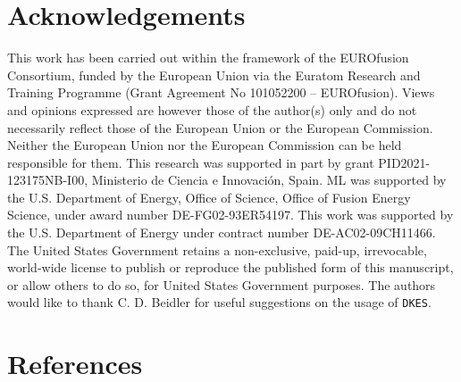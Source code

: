 \documentclass[10pt]{iopart}
\newcommand{\DKES}{{\texttt{DKES}}}
\begin{document}
\section*{Acknowledgements}
This work has been carried out within the framework of the EUROfusion Consortium, funded by the European Union via the Euratom Research and Training Programme (Grant Agreement No 101052200 – EUROfusion). Views and opinions expressed are however those of the author(s) only and do not necessarily reflect those of the European Union or the European Commission. Neither the European Union nor the European Commission can be held responsible for them. This research was supported in part by grant PID2021-123175NB-I00, Ministerio de Ciencia e Innovación, Spain. ML was supported by the U.S. Department of Energy, Office of Science, Office of Fusion Energy Science, under award number DE-FG02-93ER54197. This work was supported by the U.S. Department of Energy under contract number DE-AC02-09CH11466. The United States Government retains a non-exclusive, paid-up, irrevocable, world-wide license to publish or reproduce the published form of this manuscript, or allow others to do so, for United States Government purposes. The authors would like to thank C. D. Beidler for useful suggestions on the usage of {\DKES}.



\FloatBarrier
\appendix



	

%
	
\FloatBarrier
\section*{References}

{}
\end{document}

